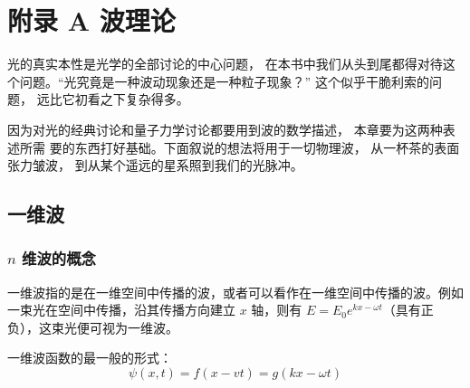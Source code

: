 \documentclass[UTF8]{report}
\theoremstyle{MyLineTheoremStyle} %
\theoremstyle{MyBlockTheoremStyle} %
\theoremstyle{MySubsubsectionStyle} %
\begin{document}
\newpage
\appendix
\titleformat{\chapter}[hang]{\normalfont\huge\bfseries\centering}{}{20pt}{}
\titlespacing*{\chapter}{0pt}{-25pt}{8pt} %
\titleformat{\section}[hang]{\normalfont\centering\Large\bfseries}{\thesection}{8pt}{}

\chapter*{附录 A\hspace*{20pt} 波理论}
\setcounter{chapter}{1}   
\setcounter{equation}{0}    %
\thispagestyle{fancy} 
\setcounter{section}{0}
\renewcommand\thesection{A.\arabic{section}}   
\renewcommand{\thefigure}{A.\arabic{figure}} 
\renewcommand{\thetable}{A.\arabic{table}}


光的真实本性是光学的全部讨论的中心问题， 在本书中我们从头到尾都得对待这个问题。“光究竟是一种波动现象还是一种粒子现象？” 这个似乎干脆利索的问题， 远比它初看之下复杂得多。

因为对光的经典讨论和量子力学讨论都要用到波的数学描述， 本章要为这两种表述所需
要的东西打好基础。下面叙说的想法将用于一切物理波， 从一杯茶的表面张力皱波， 到从某个遥远的星系照到我们的光脉冲。

\section{一维波}

\subsection{$n$ 维波的概念}

一维波指的是在一维空间中传播的波，或者可以看作在一维空间中传播的波。例如一束光在空间中传播，沿其传播方向建立 $x$ 轴，则有 $E = E_0 e^{kx - \omega t}$（具有正负），这束光便可视为一维波。

一维波函数的最一般的形式：
\begin{equation}
\psi(x,t) = f(x-vt) = g(kx - \omega t)
\end{equation}
\end{document}
